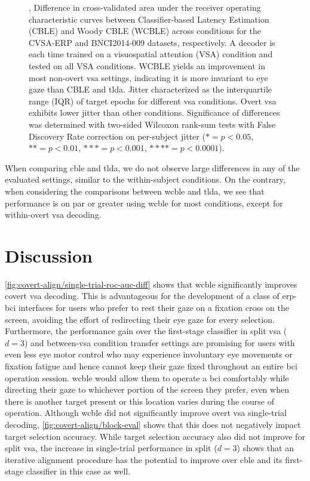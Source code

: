 \begin{figure}
  \caption[Cross-condition classifier performance and estimated jitter.]{
		,
    Difference in cross-validated area under the receiver
		operating characteristic curves between Classifier-based Latency Estimation
    (CBLE) and Woody CBLE (WCBLE) across conditions for the CVSA-ERP and
    BNCI2014-009 datasets, respectively.
    A decoder is each	time trained on a visuospatial attention (VSA) condition
    and tested on all VSA conditions.
    WCBLE yields an improvement in most
		non-overt \ac{vsa} settings, indicating it is more invariant to eye gaze than
    CBLE and \ac{tlda}.
		 Jitter characterized as the interquartile range (IQR)
		of target epochs for different \ac{vsa} conditions. Overt \ac{vsa} exhibits lower
    jitter than other conditions.
    Significance of differences
    was determined with two-sided Wilcoxon rank-sum tests with False Discovery
    Rate correction on per-subject jitter ($*= p<0.05$, $**=p<0.01$,
    $***=p<0.001$, $****=p<0.0001$).
	}
\end{figure}
When comparing \ac{cble} and \ac{tlda}, we do not observe large differences in any of the
evaluated settings, similar to the within-subject conditions.
On the contrary, when considering the comparisons between \ac{wcble} and \ac{tlda}, we
see that performance is on par or greater using \ac{wcble} for most conditions,
except for within-overt \ac{vsa} decoding.

\section{Discussion}

\cref{fig:covert-align/single-trial-roc-auc-diff} shows that \ac{wcble} significantly improves
covert \ac{vsa} decoding.
This is advantageous for the development of a class of \ac{erp}-\ac{bci} interfaces for
users who prefer to rest their gaze on a fixation cross on the screen,
avoiding the effort of redirecting their eye gaze for every selection.
Furthermore, the performance gain over the first-stage classifier in split
\ac{vsa} ($d=3$) and between-\ac{vsa} condition transfer settings are promising for
users with even less eye motor control who may experience involuntary eye
movements or fixation fatigue and hence cannot keep their gaze fixed throughout an
entire \ac{bci} operation session.
\ac{wcble} would allow them to operate a \ac{bci} comfortably while directing
their gaze to whichever portion of the screen they prefer, even when there is
another target present or this location varies during the
course of operation.
Although \ac{wcble} did not significantly improve overt \ac{vsa} single-trial decoding,
\cref{fig:covert-align/block-eval} shows that this does not negatively impact target
selection accuracy.
While target selection accuracy also did not improve for split \ac{vsa}, the
increase in single-trial performance in split ($d=3$) shows that an iterative
alignment procedure has the potential to improve over \ac{cble} and its first-stage
classifier in this case as well.


